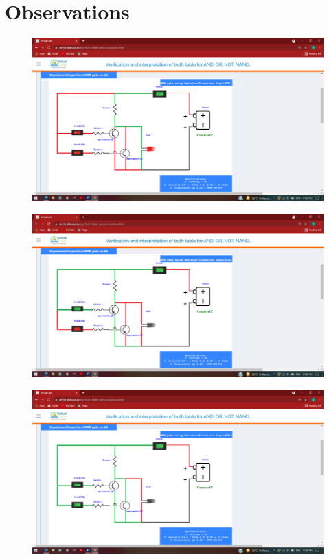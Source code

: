 \section{Observations}
	\begin{figure}[h]
		\centering
		\includegraphics[width=0.9\linewidth]{img/exp5/4}
		\caption{}
		\label{fig:5:4}
	\end{figure}
		\begin{figure}[h]
		\centering
		\includegraphics[width=0.9\linewidth]{img/exp5/5}
		\caption{}
		\label{fig:5:5}
	\end{figure}
		\begin{figure}[h]
		\centering
		\includegraphics[width=0.9\linewidth]{img/exp5/6}
		\caption{}
		\label{fig:5:6}
	\end{figure}
